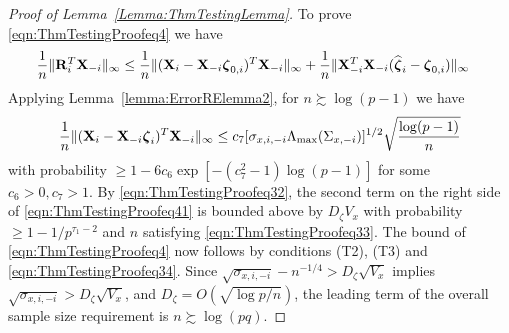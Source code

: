 \begin{proof}[Proof of Lemma~\ref{Lemma:ThmTestingLemma}]
To prove \eqref{eqn:ThmTestingProofeq4} we have
%
\begin{align}\label{eqn:ThmTestingProofeq41}
\frac{1}{n} \| {\mathbf{R}}_i^T {\mathbf{X}}_{-i} \|_\infty & \leq
\frac{1}{n} \| ({\mathbf{X}}_i - {\mathbf{X}}_{-i} {\boldsymbol{\zeta}}_{0,i})^T {\mathbf{X}}_{-i} \|_\infty +
\frac{1}{n} \| {\mathbf{X}}_{-i}^T {\mathbf{X}}_{-i} ( \widehat {{\boldsymbol{\zeta}}}_i - {\boldsymbol{\zeta}}_{0,i}) \|_\infty
\end{align}
%
Applying Lemma~\ref{lemma:ErrorRElemma2}, for $n \succsim \log(p-1)$ we have
%
%
\begin{align}
\frac{1}{n} \| ({\mathbf{X}}_i -  {\mathbf{X}}_{-i} {\boldsymbol{\zeta}}_i )^T {\mathbf{X}}_{-i} \|_\infty \leq 
c_{7} [ \sigma_{x,i,-i} \Lambda_{\max} (\Sigma_{x, -i}) ]^{1/2} \sqrt{\frac{ \log (p-1)}{n}}
\end{align}
%
with probability $\geq 1 - 6c_{6} \exp [-(c_{7}^2-1) \log (p-1)]$ for some $c_{6} >0, c_{7} > 1$. By \eqref{eqn:ThmTestingProofeq32}, the second term on the right side of \eqref{eqn:ThmTestingProofeq41} is bounded above by $D_\zeta V_x$ with probability $ \geq 1 - 1/p^{\tau_1-2}$ and $n$ satisfying \eqref{eqn:ThmTestingProofeq33}. The bound of \eqref{eqn:ThmTestingProofeq4} now follows by conditions (T2), (T3) and \eqref{eqn:ThmTestingProofeq34}. Since $\sqrt{ \sigma_{x,i,-i}} - n^{-1/4} >  D_\zeta \sqrt{ V_x} $ implies $\sqrt{ \sigma_{x,i,-i}} >  D_\zeta \sqrt{ V_x} $, and $D_\zeta = O(\sqrt{ \log p/n})$, the leading term of the overall sample size requirement is $n \succsim \log (pq)$.
\end{proof}

